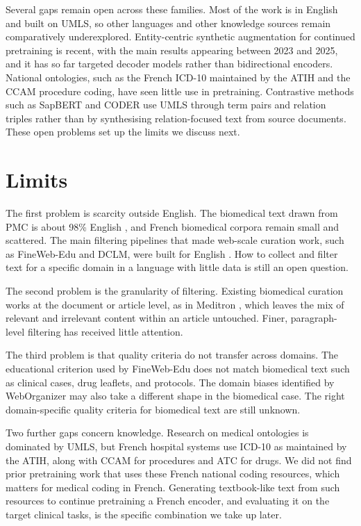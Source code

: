 Several gaps remain open across these families. Most of the work is in English and built on
UMLS, so other languages and other knowledge sources remain comparatively underexplored.
Entity-centric synthetic augmentation for continued pretraining is recent, with the main
results appearing between 2023 and 2025, and it has so far targeted decoder models rather
than bidirectional encoders. National ontologies, such as the French ICD-10 maintained by
the ATIH and the CCAM procedure coding, have seen little use in pretraining.
Contrastive methods such as SapBERT and CODER use UMLS through term pairs and relation triples
rather than by synthesising relation-focused text from source documents. These open problems
set up the limits we discuss next.
\section{Limits}
\label{sec:corpus-limitations}

The first problem is scarcity outside English. The biomedical text drawn from PMC is about 98\% English
\citep{labrak-etal-2024-biomistral}, and French biomedical corpora remain small and
scattered. The main filtering pipelines that made web-scale curation work, such as
FineWeb-Edu and DCLM, were built for English \citep{penedo2024fineweb,li2024datacomp}. How
to collect and filter text for a specific domain in a language with little data is still an
open question.

The second problem is the granularity of filtering. Existing biomedical curation works at
the document or article level, as in Meditron \citep{chen2023meditron}, which leaves the
mix of relevant and irrelevant content within an article untouched. Finer, paragraph-level
filtering has received little attention.

The third problem is that quality criteria do not transfer across domains. The educational
criterion used by FineWeb-Edu does not match biomedical text such as clinical cases, drug
leaflets, and protocols. The domain biases identified by WebOrganizer
\citep{wettig2024weborganizer} may also take a different shape in the biomedical case. The
right domain-specific quality criteria for biomedical text are still unknown.

Two further gaps concern knowledge. Research on medical ontologies is dominated by UMLS, but
French hospital systems use ICD-10 as maintained by the ATIH, along with CCAM for procedures
and ATC for drugs. We did not find prior pretraining work that uses these French national
coding resources, which matters for medical coding in French. Generating textbook-like text
from such resources to continue pretraining a French encoder, and evaluating it on the target
clinical tasks, is the specific combination we take up later.
